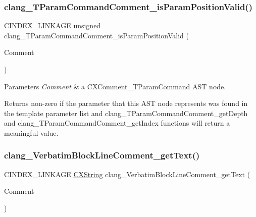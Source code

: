 \subsubsection{\texorpdfstring{clang\+\_\+\+T\+Param\+Command\+Comment\+\_\+is\+Param\+Position\+Valid()}{clang\_TParamCommandComment\_isParamPositionValid()}}
{\footnotesize\ttfamily C\+I\+N\+D\+E\+X\+\_\+\+L\+I\+N\+K\+A\+GE unsigned clang\+\_\+\+T\+Param\+Command\+Comment\+\_\+is\+Param\+Position\+Valid (\begin{DoxyParamCaption}\item[{\mbox{\hyperlink{structCXComment}{C\+X\+Comment}}}]{Comment }\end{DoxyParamCaption})}


\begin{DoxyParams}{Parameters}
{\em Comment} & a {\ttfamily C\+X\+Comment\+\_\+\+T\+Param\+Command} A\+ST node.\\
\hline
\end{DoxyParams}
\begin{DoxyReturn}{Returns}
non-\/zero if the parameter that this A\+ST node represents was found in the template parameter list and {\ttfamily clang\+\_\+\+T\+Param\+Command\+Comment\+\_\+get\+Depth} and {\ttfamily clang\+\_\+\+T\+Param\+Command\+Comment\+\_\+get\+Index} functions will return a meaningful value. 
\end{DoxyReturn}
\mbox{\label{group__CINDEX__COMMENT_ga599fad38a1c52917a2458ac10412969f}} 
\subsubsection{\texorpdfstring{clang\+\_\+\+Verbatim\+Block\+Line\+Comment\+\_\+get\+Text()}{clang\_VerbatimBlockLineComment\_getText()}}
{\footnotesize\ttfamily C\+I\+N\+D\+E\+X\+\_\+\+L\+I\+N\+K\+A\+GE \mbox{\hyperlink{structCXString}{C\+X\+String}} clang\+\_\+\+Verbatim\+Block\+Line\+Comment\+\_\+get\+Text (\begin{DoxyParamCaption}\item[{\mbox{\hyperlink{structCXComment}{C\+X\+Comment}}}]{Comment }\end{DoxyParamCaption})}


